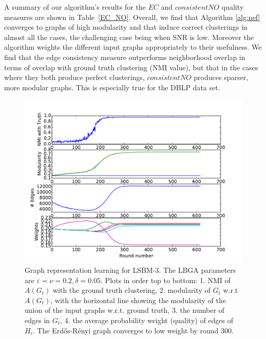 \documentclass[twoside,twocolumn]{article}
\newcommand{\er}{Erd\H{o}s-R\'{e}nyi }
\begin{document}
A summary of our algorithm's results for the $EC$ and $consistentNO$ quality
measures are shown in Table~\ref{EC_NO}. Overall, we find that Algorithm
\ref{alg:nef} converges to graphs of high modularity and that induce correct
clusterings in almost all the cases, the challenging case being when SNR is
low. Moreover the algorithm weights the different input graphs appropriately to
their usefulness. We find that the edge consistency measure outperforms
neighborhood overlap in terms of overlap with ground truth clustering (NMI
value), but that in the cases where they both produce perfect clusterings,
$consistentNO$ produces sparser, more modular graphs. This is especially true
for the DBLP data set. 

\begin{figure}[t]
\begin{centering}
\includegraphics[width=\columnwidth]{figures/LBM-SNR=6+ER-consistentNO+NEF.pdf}
\par\end{centering}
\caption{Graph representation learning for LSBM-3. The LBGA parameters are
$\varepsilon=\nu=0.2, \delta=0.05$. Plots in order top to bottom: 1. NMI of
$A(G_t)$ with the ground truth clustering, 2. modularity of $G_t$ w.r.t
$A(G_t)$, with the horizontal line showing the modularity of the union of the
input graphs w.r.t. ground truth, 3. the number of edges in $G_t$, 4.  the
average probability weight (quality) of edges of $H_i$.  The \er graph
converges to low weight by round 300.} 
\label{fig:local-sbm} 
\end{figure}
\end{document}
